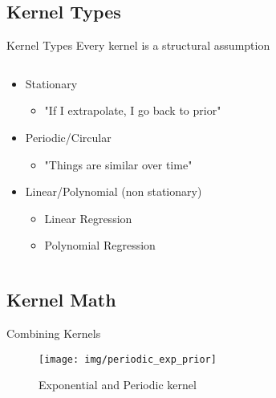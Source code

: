 \documentclass{beamer}
\begin{document}
\subsection{Kernel Types}
\begin{frame}{Kernel Types}
Every kernel is a structural assumption
\begin{columns}
    \begin{column}{0.4\linewidth}
    \begin{itemize}
        \item<alert@2> Stationary
        \begin{itemize}
            \item<2-> "If I extrapolate, I go back to prior"
        \end{itemize}
        \item<alert@3> Periodic/Circular
        \begin{itemize}
            \item<3-> "Things are similar over time"
        \end{itemize}
        \item<alert@4> Linear/Polynomial (non stationary)
        \begin{itemize}
            \item<4-> Linear Regression
            \item<4-> Polynomial Regression
        \end{itemize}
    \end{itemize}
    \end{column}
    \begin{column}{0.6\linewidth}
    \end{column}
\end{columns}
\end{frame}
\subsection{Kernel Math}
\begin{frame}{Combining Kernels}
\begin{figure}
    \centering
    \texttt{[image: img/periodic\_exp\_prior]}
    \caption{Exponential and Periodic kernel}
\end{figure}
\end{frame}
\end{document}

